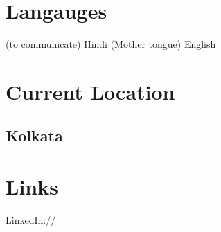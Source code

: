 \documentclass[]{deedy-resume-openfont}
\begin{document}
\begin{minipage}[t]{0.33\textwidth} 
\section{Langauges}

(to communicate)
\hfill \break
\textbullet{} Hindi (Mother tongue)
\textbullet{} English

\sectionsep

\section{Current Location}
\subsection {Kolkata}

\sectionsep

\section{Links} 
LinkedIn://  \href{https://www.linkedin.com/in/ankit-kumar-279593112}{} \\
\sectionsep

\end{minipage} 
\hfill
\end{document}
